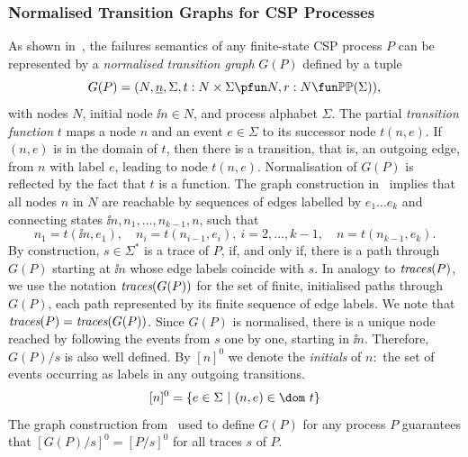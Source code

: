 \subsubsection*{Normalised Transition Graphs for CSP Processes}
\label{sec:ntg}

As shown in~\cite{Roscoe:1994:chapter}, the failures semantics of any
finite-state CSP process $P$ can be represented by a \emph{normalised
transition graph} $G(P)$ defined by a tuple
$$
G(P) = ( N, \ii n, \Sigma, t : N\times\Sigma \pfun N, r : N \fun \mathbb{P}\mathbb{P}(\Sigma)),
$$
with nodes $N$, initial node $\ii n\in N$, and process alphabet $\Sigma$. The
partial \emph{transition function} $t$ maps a node $n$ and an event
$e\in\Sigma$ to its successor node $t(n,e)$. If $(n,e)$ is in the domain of
$t$, then there is a transition, that is, an outgoing edge, from $n$ with
label $e$, leading to node $t(n,e)$. Normalisation of $G(P)$ is reflected by
the fact that $t$ is a function. The graph construction
in~\cite{Roscoe:1994:chapter} implies that all nodes $n$ in $N$ are
reachable by sequences of edges labelled by $e_1\dots e_k$ and connecting
states $\ii n,n_1,\dots,n_{k-1},n$, such that
\[
n_1 = t(\ii n,e_1), \quad n_i = t(n_{i-1},e_i),\ i = 2,\dots,k-1,\quad
n= t(n_{k-1},e_k).
\]
%
By construction, $s\in\Sigma^*$ is a trace of $P$, if, and only if, there is
a path through $G(P)$ starting  at $\ii n$ whose edge labels coincide with
$s$. In analogy to $\text{\it traces}(P)$, we use the notation $\text{\it traces}(G(P))$ for the set of
finite, initialised paths through $G(P)$, each path represented by its finite
sequence of edge labels. We note that $\text{\it traces}(P) = \text{\it traces}(G(P))$. Since $G(P)$ is
normalised, there is a unique node reached by following the events from $s$
one by one, starting in $\ii n$. Therefore, $G(P)/s$  is also well defined.
By $[n]^0$ we denote the \emph{initials} of $n$:~the set of events occurring
as labels in any outgoing transitions.
$$
[n]^0 = \{ e\in\Sigma~|~(n,e)\in\dom~t \}
$$
The graph construction from~\cite{Roscoe:1994:chapter} used to define
$G(P)$ for any process $P$ guarantees that $[G(P)/s]^0 = [P/s]^0$ for all
traces $s$ of $P$.

